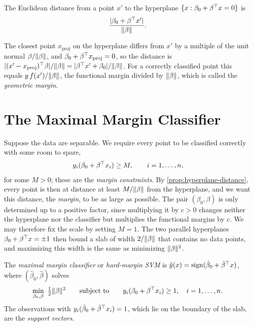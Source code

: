 \begin{proposition}\label{prop:hyperplane-distance}
The Euclidean distance from a point $x'$ to the hyperplane $\{x:\beta_0+\beta^{\top} x=0\}$ is
\[
\frac{|\beta_0+\beta^{\top} x'|}{\lVert \beta\rVert}.
\]
\end{proposition}

The closest point $x_{\mathrm{proj}}$ on the hyperplane differs from $x'$ by a multiple of the unit normal $\beta/\lVert \beta\rVert$, and $\beta_0+\beta^{\top} x_{\mathrm{proj}}=0$, so the distance is $|(x'-x_{\mathrm{proj}})^{\top}\beta|/\lVert \beta\rVert=|\beta^{\top} x'+\beta_0|/\lVert \beta\rVert$. For a correctly classified point this equals $y\,f(x')/\lVert \beta\rVert$, the functional margin divided by $\lVert \beta\rVert$, which is called the \emph{geometric margin}.

\section{The Maximal Margin Classifier}\label{sec:hard-margin}

Suppose the data are separable. We require every point to be classified correctly with some room to spare,
\[
y_i(\beta_0+\beta^{\top} x_i)\ge M,\qquad i=1,\dots,n,
\]
for some $M>0$; these are the \emph{margin constraints}. By \cref{prop:hyperplane-distance}, every point is then at distance at least $M/\lVert \beta\rVert$ from the hyperplane, and we want this distance, the \emph{margin}, to be as large as possible. The pair $(\beta_0,\beta)$ is only determined up to a positive factor, since multiplying it by $c>0$ changes neither the hyperplane nor the classifier but multiplies the functional margins by $c$. We may therefore fix the scale by setting $M=1$. The two parallel hyperplanes $\beta_0+\beta^{\top} x=\pm1$ then bound a slab of width $2/\lVert \beta\rVert$ that contains no data points, and maximizing this width is the same as minimizing $\lVert \beta\rVert^2$.

\begin{definition}\label{def:hard-margin-svm}
The \emph{maximal margin classifier} or \emph{hard-margin SVM} is $\hat y(x)=\operatorname{sign}(\hat\beta_0+\hat\beta^{\top} x)$, where $(\hat\beta_0,\hat\beta)$ solves
\[
\min_{\beta_0,\beta}\ \tfrac12\norm{\beta}^2\qquad\text{subject to}\qquad y_i(\beta_0+\beta\T x_i)\ge1,\quad i=1,\dots,n.
\]
The observations with $y_i(\hat\beta_0+\hat\beta^{\top} x_i)=1$, which lie on the boundary of the slab, are the \emph{support vectors}.
\end{definition}

